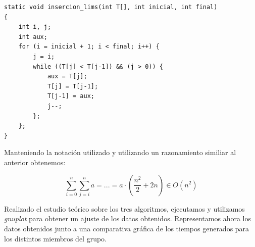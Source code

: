 \documentclass[11pt,a4paper]{article}
\begin{document}
\begin{lstlisting}
static void insercion_lims(int T[], int inicial, int final)
{
	int i, j;
	int aux;
	for (i = inicial + 1; i < final; i++) {
		j = i;
		while ((T[j] < T[j-1]) && (j > 0)) {
			aux = T[j];
			T[j] = T[j-1];
			T[j-1] = aux;
			j--;
		};
	};
}
\end{lstlisting}

Manteniendo la notación utilizado y utilizando un razonamiento similiar al anterior obtenemos:

$$\sum_{i=0}^{n} \sum_{j=i}^{n} a = ... = a \cdot (\frac{n^2}{2} + 2n) \in O(n^2)$$

Realizado el estudio teórico sobre los tres algoritmos, ejecutamos y utilizamos \emph{gnuplot} para obtener un ajuste de los datos obtenidos. Representamos ahora los datos obtenidos junto a una comparativa gráfica de los tiempos generados para los distintos miembros del grupo. 
\end{document}
